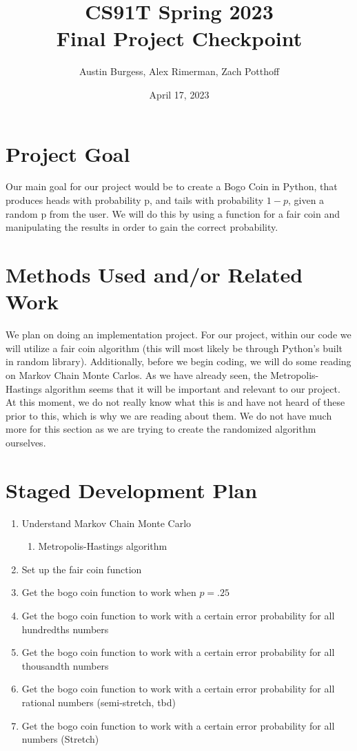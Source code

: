 \documentclass{article}
\title{CS91T Spring 2023\\Final Project Checkpoint}
\author{Austin Burgess, Alex Rimerman, Zach Potthoff}
\date{April 17, 2023}
\begin{document}
\maketitle

\section{Project Goal}

Our main goal for our project would be to create a Bogo Coin in Python, that
produces heads with probability p, and tails with probability $1 - p$, given 
a random p from the user. We will do this by using a function for a fair coin
and manipulating the results in order to gain the correct probability.

\section{Methods Used and/or Related Work}

We plan on doing an implementation project. For our project, within our 
code we will utilize a fair coin algorithm (this will most likely be
through Python's built in random library). Additionally, before we begin 
coding, we will do some reading on Markov Chain Monte Carlos. As we have 
 already seen, the Metropolis-Hastings algorithm seems that it will 
 be important and relevant to our project. At this moment, 
we do not really know what this is and have not heard of these prior 
to this, which is why we are reading about them. We do not have much more 
for this section as we are trying to create the randomized algorithm 
ourselves.

\section{Staged Development Plan}

\begin{enumerate}
    \item Understand Markov Chain Monte Carlo
    \begin{enumerate}
        \item Metropolis-Hastings algorithm
    \end{enumerate}
    \item Set up the fair coin function
    \item Get the bogo coin function to work when $p = .25$
    \item Get the bogo coin function to work with a certain error probability
    for all hundredths numbers
    \item Get the bogo coin function to work with a certain error probability
    for all thousandth numbers
    \item Get the bogo coin function to work with a certain error probability
    for all rational numbers (semi-stretch, tbd)
    \item Get the bogo coin function to work with a certain error probability
    for all numbers (Stretch)
\end{enumerate} 
\end{document}
